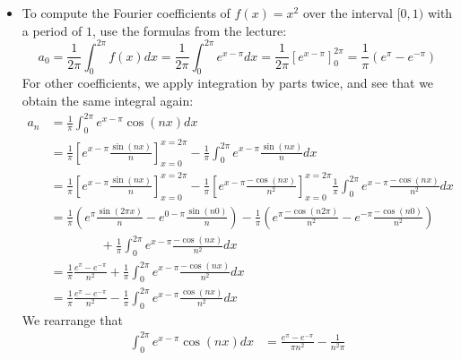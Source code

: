\documentclass[11pt]{article}
\begin{document}
\begin{solution}     
    \begin{itemize}
    \item To compute the Fourier coefficients of $f(x) = x^2$ over the interval $[0,1)$ with a period of $1$, use the formulas from the lecture:
    \[
        a_0 
        = 
        \frac{1}{2\pi}\int_{0}^{2\pi} f(x) dx  = \frac{1}{2\pi}\int_{0}^{2\pi} e^{x-\pi} dx  = \frac{1}{2\pi}\left[ e^{x-\pi} \right]_{0}^{2\pi} = \frac{1}{\pi}\left(e^{\pi} - e^{-\pi}\right)
    \]
    For other coefficients, we apply integration by parts twice, and see that we obtain the same integral again:
    \begin{align*}
        a_n 
        &
        = 
        \frac{1}{\pi}
        \int_{0}^{2\pi} e^{x - \pi} \cos( n x) dx
        \\&
        =
        \frac{1}{\pi}
        \left[ e^{x - \pi} \frac{ \sin(n x) }{ n } \right]_{x=0}^{x=2\pi}
        -
        \frac{1}{\pi}
        \int_{0}^{2\pi} e^{x-\pi}\frac{ \sin( n x) }{ n } dx
        \\&
        =
        \frac{1}{\pi}
        \left[ e^{x - \pi} \frac{ \sin(n x) }{ n } \right]_{x=0}^{x=2\pi}
        -
        \frac{1}{\pi}
        \left[ e^{x - \pi} \frac{ -\cos(n x) }{ n^2 } \right]_{x=0}^{x=2\pi}
        \frac{1}{\pi}
        \int_{0}^{2\pi} e^{x-\pi}\frac{ -\cos(n x) }{ n^2 } dx
        \\&
        =
        \frac{1}{\pi}
        \left( e^{\pi} \frac{ \sin(2\pi x) }{ n } - e^{0 - \pi} \frac{ \sin(n 0) }{ n } \right)
        -
        \frac{1}{\pi}
        \left( e^{\pi} \frac{ -\cos(n 2\pi) }{ n^2 } - e^{- \pi} \frac{ -\cos(n 0) }{ n^2 } \right)
        \\&\qquad\qquad
        +
        \frac{1}{\pi}
        \int_{0}^{2\pi} e^{x-\pi}\frac{ -\cos(n x) }{ n^2 } dx
        \\&
        =
        \frac{1}{\pi}\frac{e^{\pi} - e^{-\pi}}{n^2}
        +
        \frac{1}{\pi}
        \int_{0}^{2\pi} e^{x-\pi}\frac{ -\cos(n x) }{ n^2 } dx
        \\&
        =
        \frac{1}{\pi}\frac{e^{\pi} - e^{-\pi}}{n^2}
        -
        \frac{1}{\pi}
        \int_{0}^{2\pi} e^{x-\pi}\frac{ \cos(n x) }{ n^2 } dx
        \end{align*}
        We rearrange that 
        \begin{align*}
            \int_{0}^{2\pi} e^{x-\pi} \cos(n x) dx
            &=
            \frac{e^{\pi} - e^{-\pi}}{\pi n^2}
            -
            \frac{1}{n^2\pi}

\end{align*}
\end{itemize}
\end{solution}
\end{document}
